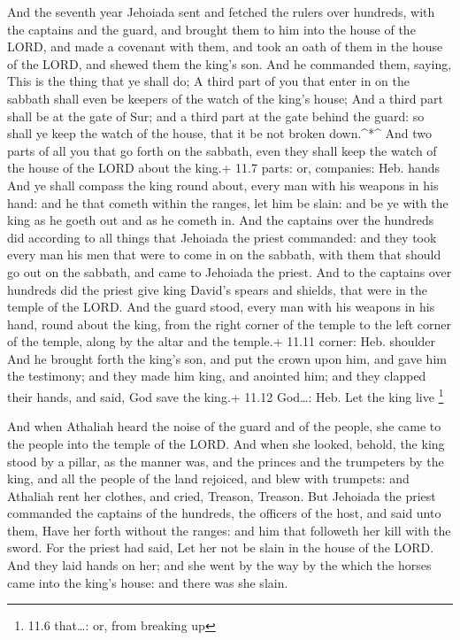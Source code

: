  And the seventh year Jehoiada sent and fetched the rulers
over hundreds, with the captains and the guard, and brought them to him
into the house of the LORD, and made a covenant with them, and took an
oath of them in the house of the LORD, and shewed them the king's son.
 And he commanded them, saying, This is the thing that ye
shall do; A third part of you that enter in on the sabbath shall even be
keepers of the watch of the king's house;  And a third part
shall be at the gate of Sur; and a third part at the gate behind the
guard: so shall ye keep the watch of the house, that it be not broken
down.\^{}*\^{}  And two parts of all you that go forth on
the sabbath, even they shall keep the watch of the house of the LORD
about the king.+ 11.7 parts: or, companies: Heb. hands  And
ye shall compass the king round about, every man with his weapons in his
hand: and he that cometh within the ranges, let him be slain: and be ye
with the king as he goeth out and as he cometh in.  And the
captains over the hundreds did according to all things that Jehoiada the
priest commanded: and they took every man his men that were to come in
on the sabbath, with them that should go out on the sabbath, and came to
Jehoiada the priest.  And to the captains over hundreds did
the priest give king David's spears and shields, that were in the temple
of the LORD.  And the guard stood, every man with his
weapons in his hand, round about the king, from the right corner of the
temple to the left corner of the temple, along by the altar and the
temple.+ 11.11 corner: Heb. shoulder  And he brought forth
the king's son, and put the crown upon him, and gave him the testimony;
and they made him king, and anointed him; and they clapped their hands,
and said, God save the king.+ 11.12 God\ldots: Heb. Let the king live
\footnote{11.6 that\ldots: or, from breaking up}

 And when Athaliah heard the noise of the guard and of the
people, she came to the people into the temple of the LORD.
 And when she looked, behold, the king stood by a pillar,
as the manner was, and the princes and the trumpeters by the king, and
all the people of the land rejoiced, and blew with trumpets: and
Athaliah rent her clothes, and cried, Treason, Treason. 
But Jehoiada the priest commanded the captains of the hundreds, the
officers of the host, and said unto them, Have her forth without the
ranges: and him that followeth her kill with the sword. For the priest
had said, Let her not be slain in the house of the LORD. 
And they laid hands on her; and she went by the way by the which the
horses came into the king's house: and there was she slain.

